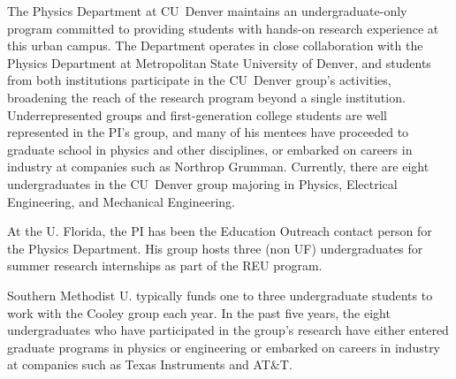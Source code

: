 The Physics Department at CU~Denver maintains an undergraduate-only program committed to providing students with hands-on research experience at this urban campus. The Department operates in close collaboration with the Physics Department at Metropolitan State University of Denver, and students from both institutions participate in the CU~Denver group’s activities, broadening the reach of the research program beyond a single institution. Underrepresented groups and first-generation college students are well represented in the PI’s group, and many of his mentees have proceeded to graduate school in physics and other disciplines, or embarked on careers in industry at companies such as Northrop Grumman. Currently, there are eight undergraduates in the CU~Denver group majoring in Physics, Electrical Engineering, and Mechanical Engineering.  

At the U. Florida, the PI has been the Education Outreach contact person for the Physics Department. His group hosts three (non UF) undergraduates for summer research internships as part of the REU program. 


Southern Methodist U. typically funds one to three undergraduate students to work with the Cooley group each year. In the past five years, the eight undergraduates who have participated in the group’s research have either entered graduate programs in physics or engineering or embarked on careers in industry at companies such as Texas Instruments and AT\&T.  

